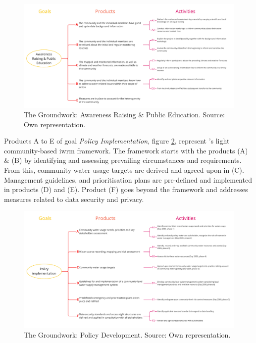 \begin{figure}[!htp]
    \centering
    \includegraphics[width=1.0\textwidth]{figures/2023_MA_results_awareness.pdf}
    \decoRule
    \caption[PRC: The Groundwork - Awareness Raising \& Public Education]{The Groundwork: Awareness Raising \& Public Education. Source: Own representation.}
    \label{fig:res_groundwork_ar}
\end{figure}

Products A to E of goal \textit{Policy Implementation}, figure \ref{fig:res_groundwork_pd}, represent \citeauthor{dayCommunitybasedWaterResources2009}'s \citeyear{dayCommunitybasedWaterResources2009} light community-based \acrshort{iwrm} framework. The framework starts with the products (A) \& (B) by identifying and assessing prevailing circumstances and requirements. From this, community water usage targets are derived and agreed upon in (C). Management guidelines, and prioritisation plans are pre-defined and implemented in products (D) and (E). Product (F) goes beyond the framework and addresses measures related to data security and privacy.

\begin{figure}[!htp]
    \centering
    \includegraphics[width=1.0\textwidth]{figures/2023_MA_results_policy.pdf}
    \decoRule
    \caption[PRC: The Groundwork - Policy Development]{The Groundwork: Policy Development. Source: Own representation.}
    \label{fig:res_groundwork_pd}
\end{figure}

